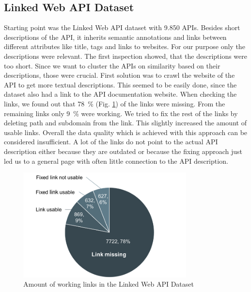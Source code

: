 \documentclass[a4paper]{IEEEtran}
\begin{document}
\subsection{Linked Web API Dataset}
Starting point was the Linked Web API dataset \cite{dojchinovskilinked} with 9.850 APIs. Besides short descriptions of the API, it inherits semantic annotations and links between different attributes like title, tags and links to websites. For our purpose only the descriptions were relevant. The first inspection showed, that the descriptions were too short. Since we want to cluster the APIs on similarity based on their descriptions, those were crucial. First solution was to crawl the website of the API to get more textual descriptions. This seemed to be easily done, since the dataset also had a link to the API documentation website. When checking the links, we found out that 78~\% (Fig. \ref{fig_sim2}) of the links were missing. From the remaining links only 9~\% were working. We tried to fix the rest of the links by deleting path and subdomain from the link. This slightly increased the amount of usable links. Overall the data quality which is achieved with this approach can be considered insufficient. A lot of the links do not point to the actual API description either because they are outdated or because the fixing approach just led us to a general page with often little connection to the API description.
\begin{figure}[h]
\centering
\includegraphics[width= 3.5in]{img/fig2.png}
\caption{Amount of working links in the Linked Web API Dataset}
\label{fig_sim2}
\end{figure}
\end{document}
